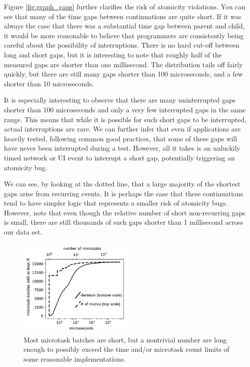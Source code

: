 \documentclass[sigplan,10pt,review,anonymous]{acmart}\settopmatter{printfolios=true,printccs=false,printacmref=false}
\begin{document}
Figure \ref{fig:graph_gaps} further clarifies the risk of atomicity violations.
You can see that many of the time gaps between continuations are quite short.
If it was always the case that there was a substantial time gap between parent and child, it would be more reasonable to believe that programmers are consistently being careful about the possibility of interruptions.
There is no hard cut-off between long and short gaps, but it is interesting to note that roughly half of the measured gaps are shorter than one millisecond.
The distribution tails off fairly quickly, but there are still many gaps shorter than 100 microseconds, and a few shorter than 10 microseconds.

It is especially interesting to observe that there are many uninterrupted gaps shorter than 100 microseconds and only a very few interrupted gaps in the same range.
This means that while it is possible for such short gaps to be interrupted, actual interruptions are rare.
We can further infer that even if applications are heavily tested, following common good practices, that some of these gaps will have never been interrupted during a test.
However, all it takes is an unluckily timed network or UI event to interrupt a short gap, potentially triggering an atomicity bug.

We can see, by looking at the dotted line, that a large majority of the shortest gaps arise from recurring events.
It is perhaps the case that these continuations tend to have simpler logic that represents a smaller risk of atomicity bugs.
However, note that even though the relative number of short non-recurring gaps is small, there are still thousands of such gaps shorter than 1 millisecond across our data set.

\begin{figure}
\hspace*{-0.2cm}\includegraphics[width=0.5\textwidth]{micros_graph_bw}
\caption{Most microtask batches are short, but a nontrivial number are long enough to possibly exceed the time and/or microtask count limits of some reasonable implementations.}
\label{fig:graph_microtasks}
\end{figure}
\end{document}
